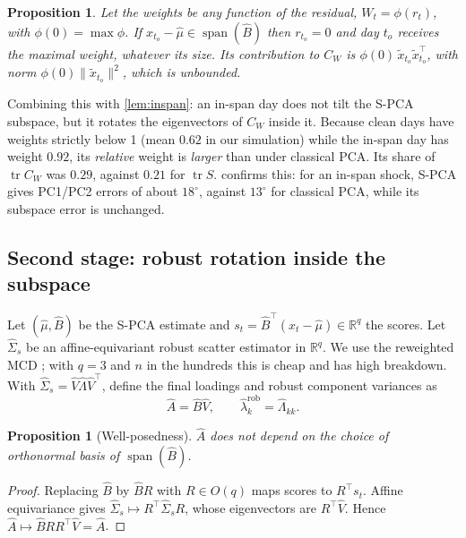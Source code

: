 \documentclass[11pt]{article}
\newtheorem{proposition}[theorem]{Proposition}
\theoremstyle{definition}
\theoremstyle{remark}
\DeclareMathOperator{\tr}{tr}
\DeclareMathOperator{\spn}{span}
\newcommand{\R}{\mathbb{R}}
\newcommand{\norm}[1]{\lVert #1\rVert}
\newcommand{\tx}{\tilde{x}}
\begin{document}
\begin{proposition}\label{prop:residblind}
Let the weights be any function of the residual, $W_t=\phi(r_t)$, with $\phi(0)=\max\phi$. If $x_{t_o}-\hat\mu\in\spn(\hat B)$
then $r_{t_o}=0$ and day $t_o$ receives the maximal weight, whatever its size. Its contribution to $C_W$ is
$\phi(0)\,\tx_{t_o}\tx_{t_o}^\top$, with norm $\phi(0)\norm{\tx_{t_o}}^2$, which is unbounded.
\end{proposition}

Combining this with \cref{lem:inspan}: an in-span day does not tilt the S-PCA subspace, but it rotates the eigenvectors
of $C_W$ inside it. Because clean days have weights strictly below 1 (mean $0.62$ in our simulation) while the in-span
day has weight $0.92$, its \emph{relative} weight is \emph{larger} than under classical PCA. Its share of $\tr C_W$ was
$0.29$, against $0.21$ for $\tr S$.  confirms this: for an in-span shock, S-PCA gives PC1/PC2 errors of
about $18^\circ$, against $13^\circ$ for classical PCA, while its subspace error is unchanged.

\subsection{Second stage: robust rotation inside the subspace}\label{sec:stage2}

Let $(\hat\mu,\hat B)$ be the S-PCA estimate and $s_t=\hat B^\top(x_t-\hat\mu)\in\R^q$ the scores. Let $\hat\Sigma_s$ be an
affine-equivariant robust scatter estimator in $\R^q$. We use the reweighted MCD \citep{RousseeuwVanDriessen1999}; with
$q=3$ and $n$ in the hundreds this is cheap and has high breakdown. With $\hat\Sigma_s=\hat V\hat\Lambda\hat V^\top$, define
the final loadings and robust component variances as
\begin{equation}\label{eq:stage2}
\hat A=\hat B\hat V,\qquad \hat\lambda_k^{\mathrm{rob}}=\hat\Lambda_{kk}.
\end{equation}

\begin{proposition}[Well-posedness]\label{prop:stage2}
$\hat A$ does not depend on the choice of orthonormal basis of $\spn(\hat B)$.
\end{proposition}
\begin{proof}
Replacing $\hat B$ by $\hat BR$ with $R\in O(q)$ maps scores to $R^\top s_t$. Affine equivariance gives
$\hat\Sigma_s\mapsto R^\top\hat\Sigma_sR$, whose eigenvectors are $R^\top\hat V$. Hence $\hat A\mapsto\hat BRR^\top\hat V=\hat A$.
\end{proof}
\end{document}
